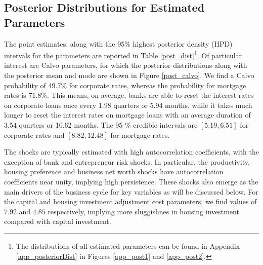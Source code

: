 \documentclass[12pt]{article}
\numberwithin{equation}{section}
\begin{document}

\subsection{Posterior Distributions for Estimated Parameters}

The point estimates, along with the 95\% highest posterior density (HPD) intervals for the parameters are reported in Table \ref{post_dist}\footnote{The distributions of all estimated parameters can be found in Appendix \ref{app_posteriorDist} in Figures \ref{app_post1} and \ref{app_post2}.}. Of particular interest are Calvo parameters, for which the posterior distributions along with the posterior mean and mode are shown in Figure \ref{post_calvo}. We find a Calvo probability of 49.7\% for corporate rates, whereas the probability for mortgage rates is 71.8\%. This means, on average, banks are able to reset the interest rates on corporate loans once every 1.98 quarters or 5.94 months, while it takes much longer to reset the interest rates on mortgage loans with an average duration of 3.54 quarters or 10.62 months. The 95 \% credible intervals are $[5.19, 6.51]$ for corporate rates and $[8.82,12.48]$ for mortgage rates. 

The shocks are typically estimated with high autocorrelation coefficients, with the exception of bank and entrepreneur risk shocks. In particular, the productivity, housing preference and business net worth shocks have autocorrelation coefficients near unity, implying high persistence. These shocks also emerge as the main drivers of the business cycle for key variables as will be discussed below. For the capital and housing investment adjustment cost parameters, we find values of $7.92$ and $4.85$ respectively, implying more sluggishnes in housing investment compared with capital investment. 
\end{document}
